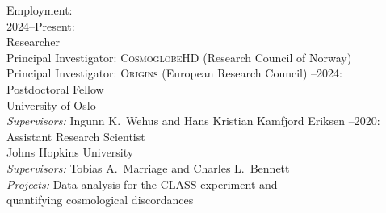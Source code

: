 \documentclass[a4paper]{resume}
\author{Duncan Joseph Watts}
\begin{document}
\maketitle




\begin{category}{Employment:}
\citemnobullet\\
2024--Present:\\
Researcher\\
Principal Investigator: \textsc{CosmoglobeHD} (Research Council of Norway)\\
Principal Investigator: \textsc{Origins} (European Research Council)
--2024:\\
Postdoctoral Fellow\\
University of Oslo\\
\qquad \textsl{Supervisors:} Ingunn K.~Wehus and Hans Kristian Kamfjord
    Eriksen
--2020:\\
Assistant Research Scientist\\
Johns Hopkins University\\
\qquad \textsl{Supervisors:} Tobias A.~Marriage and Charles
L.~Bennett\\
\qquad \textsl{Projects:} Data analysis for the CLASS experiment and\\
\qquad {} quantifying cosmological discordances
\end{category}

\end{document}
